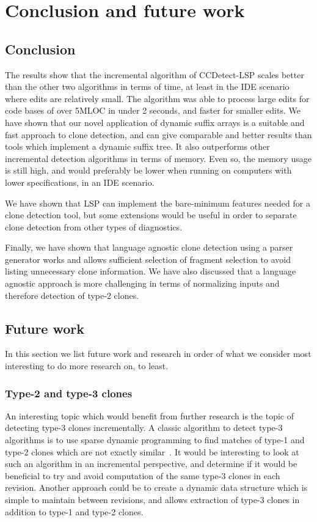 \chapter{Conclusion and future work}

\section{Conclusion}

The results show that the incremental algorithm of CCDetect-LSP scales better than the
other two algorithms in terms of time, at least in the IDE scenario where edits are
relatively small. The algorithm was able to process large edits for code bases of over
5MLOC in under 2 seconds, and faster for smaller edits. We have shown that our novel
application of dynamic suffix arrays is a suitable and fast approach to clone detection,
and can give comparable and better results than tools which implement a dynamic suffix
tree. It also outperforms other incremental detection algorithms in terms of memory. Even
so, the memory usage is still high, and would preferably be lower when running on
computers with lower specifications, in an IDE scenario. 

We have shown that LSP can implement the bare-minimum features needed for a clone
detection tool, but some extensions would be useful in order to separate clone detection
from other types of diagnostics.

Finally, we have shown that language agnostic clone detection using a parser generator
works and allows sufficient selection of fragment selection to avoid listing unnecessary
clone information. We have also discussed that a language agnostic approach is more
challenging in terms of normalizing inputs and therefore detection of type-2 clones.

\section{Future work}

In this section we list future work and research in order of what we consider
most interesting to do more research on, to least.

\subsection*{Type-2 and type-3 clones}

An interesting topic which would benefit from further research is the topic of detecting
type-3 clones incrementally. A classic algorithm to detect type-3 algorithms is to use
sparse dynamic programming to find matches of type-1 and type-2 clones which are not
exactly similar~\cite{BakerSparseDynamicProgramming}. It would be interesting to look at
such an algorithm in an incremental perspective, and determine if it would be beneficial
to try and avoid computation of the same type-3 clones in each revision. Another approach
could be to create a dynamic data structure which is simple to maintain between revisions,
and allows extraction of type-3 clones in addition to type-1 and type-2 clones. 

